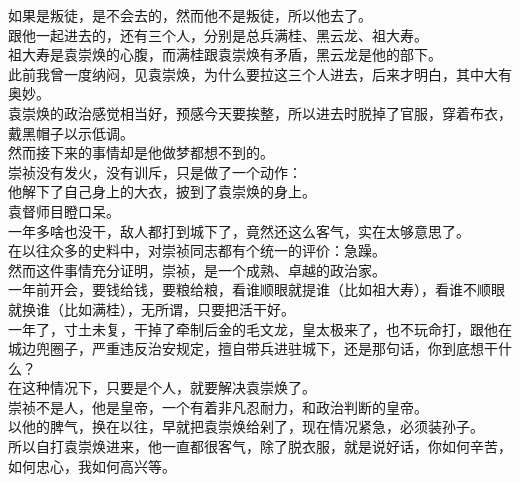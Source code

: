\begin{multicols}{\theparacolNo}
如果是叛徒，是不会去的，然而他不是叛徒，所以他去了。\\

跟他一起进去的，还有三个人，分别是总兵满桂、黑云龙、祖大寿。\\

祖大寿是袁崇焕的心腹，而满桂跟袁崇焕有矛盾，黑云龙是他的部下。\\

此前我曾一度纳闷，见袁崇焕，为什么要拉这三个人进去，后来才明白，其中大有奥妙。\\

袁崇焕的政治感觉相当好，预感今天要挨整，所以进去时脱掉了官服，穿着布衣，戴黑帽子以示低调。\\

然而接下来的事情却是他做梦都想不到的。\\

崇祯没有发火，没有训斥，只是做了一个动作：\\

他解下了自己身上的大衣，披到了袁崇焕的身上。\\

袁督师目瞪口呆。\\

一年多啥也没干，敌人都打到城下了，竟然还这么客气，实在太够意思了。\\

在以往众多的史料中，对崇祯同志都有个统一的评价：急躁。\\

然而这件事情充分证明，崇祯，是一个成熟、卓越的政治家。\\

一年前开会，要钱给钱，要粮给粮，看谁顺眼就提谁（比如祖大寿），看谁不顺眼就换谁（比如满桂），无所谓，只要把活干好。\\

一年了，寸土未复，干掉了牵制后金的毛文龙，皇太极来了，也不玩命打，跟他在城边兜圈子，严重违反治安规定，擅自带兵进驻城下，还是那句话，你到底想干什么？\\

在这种情况下，只要是个人，就要解决袁崇焕了。\\

崇祯不是人，他是皇帝，一个有着非凡忍耐力，和政治判断的皇帝。\\

以他的脾气，换在以往，早就把袁崇焕给剁了，现在情况紧急，必须装孙子。\\

所以自打袁崇焕进来，他一直都很客气，除了脱衣服，就是说好话，你如何辛苦，如何忠心，我如何高兴等。\\


\end{multicols}
